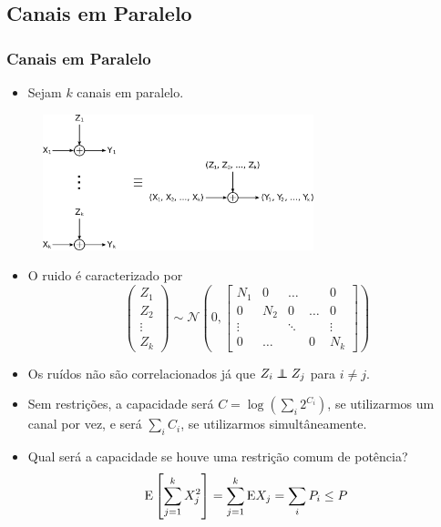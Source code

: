\subsection{Canais em Paralelo}
\begin{frame}[allowframebreaks]
  \frametitle{Canais em Paralelo}
  \begin{itemize}
  \item Sejam $k$ canais em paralelo.
  \end{itemize}

        \begin{figure}[h!]
        \centering
        \includegraphics[width=0.7\textwidth]{images/parallelchannels.pdf}
        \label{fig:parallelchannels}
        \end{figure}

  \begin{itemize}
  \item O ruido é caracterizado por
	\begin{equation}
	\begin{pmatrix}
	Z_1 \\ Z_2 \\ \vdots \\ Z_k
	\end{pmatrix} \sim
	\mathcal{N} \left(0, 
		\begin{bmatrix} N_1 & 0 & \ldots & & 0 \\
				0 & N_2 & 0 & \ldots & 0 \\
				\vdots & & \ddots &  & \vdots \\
				0 & \ldots & & 0 & N_k 
		\end{bmatrix}
	  \right)
	\end{equation}
  \item Os ruídos não são correlacionados já que $Z_i \independent Z_j$ para $i \neq j$.

  \item Sem restrições, a capacidade será $C = \log \left( \sum_i 2^{C_i} \right)$, se utilizarmos
	um canal por vez, e será $\sum_i C_i$, se utilizarmos simultâneamente.
  \item Qual será a capacidade se houve uma restrição comum de potência?
	\begin{equation}
	\mathrm{E} \left[ \sum_{j=1}^{k} X^2_j \right] = \sum_{j=1}^{k} \mathrm{E} X_j = \sum_i P_i \leq P
	\end{equation}


\end{itemize}
\end{frame}
